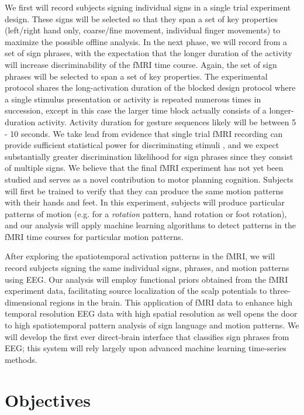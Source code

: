 \documentclass{proposal}
\begin{document}
We first will record subjects signing individual signs in a single trial experiment design. These signs will be selected so that they span a set of key properties (left/right hand only, coarse/fine movement, individual finger movements) to maximize the possible offline analysis. In the next phase, we will record from a set of sign phrases, with the expectation that the longer duration of the activity will increase discriminability of the fMRI time course. Again, the set of sign phrases will be selected to span a set of key properties. The experimental protocol shares the long-activation duration of the blocked design protocol where a single stimulus presentation or activity is repeated numerous times in succession, except in this case the larger time block actually consists of a longer-duration activity. Activity duration for gesture sequences likely will be between 5 - 10 seconds. We take lead from evidence that single trial fMRI recording can provide sufficient statistical power for discriminating stimuli \cite[]{buckner1996dca}, and we expect substantially greater discrimination likelihood for sign phrases since they consist of multiple signs. We believe that the final fMRI experiment has not yet been studied and serves as a novel contribution to motor planning cognition. Subjects will first be trained to verify that they can produce the same motion patterns with their hands and feet. In this experiment, subjects will produce particular patterns of motion (e.g. for a \textit{rotation} pattern, hand rotation or foot rotation), and our analysis will apply machine learning algorithms to detect patterns in the fMRI time courses for particular motion patterns.

After exploring the spatiotemporal activation patterns in the fMRI, we will record subjects signing the same individual signs, phrases, and motion patterns using EEG. Our analysis will employ functional priors obtained from the fMRI experiment data, facilitating source localization of the scalp potentials to three-dimensional regions in the brain. This application of fMRI data to enhance high temporal resolution EEG data with high spatial resolution as well opens the door to high spatiotemporal pattern analysis of sign language and motion patterns. We will develop the first ever direct-brain interface that classifies sign phrases from EEG; this system will rely largely upon advanced machine learning time-series methods.


\section{Objectives}
\end{document}
